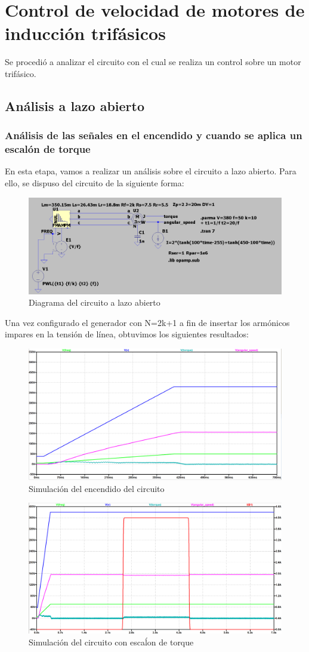 \documentclass[e4_tp3_main.tex]{subfiles}
\begin{document}

\section{Control de velocidad de motores de inducción trifásicos}
Se procedió a analizar el circuito con el cual se realiza un control sobre un motor trifásico.
\subsection{Análisis a lazo abierto}

\subsubsection{An\'alisis de las señales en el encendido y cuando se aplica un escal\'on de torque}

En esta etapa, vamos a realizar un análisis sobre el circuito a lazo abierto. Para ello, se dispuso del circuito de la siguiente forma:
\begin{figure}[H]
\centering
\includegraphics[width=0.5\linewidth]{Imagenes/3-1-a-circuito.png}
\caption{Diagrama del circuito a lazo abierto}
\end{figure}

Una vez configurado el generador con N=2k+1 a fin de insertar los armónicos impares en la tensión de línea, obtuvimos los siguientes resultados:

\begin{figure}[H]
	\centering
	\includegraphics[width=0.6\linewidth]{Imagenes/3-1-a-inicio.png}
	\caption{Simulaci\'on del encendido del circuito}
	\label{fig:enc}
\end{figure}

\begin{figure}[H]
	\centering
	\includegraphics[width=0.6\linewidth]{Imagenes/3-1-a-general.png}
	\caption{Simulación del circuito con esca\'lon de torque}
	\label{fig:torq}
\end{figure}
\end{document}
